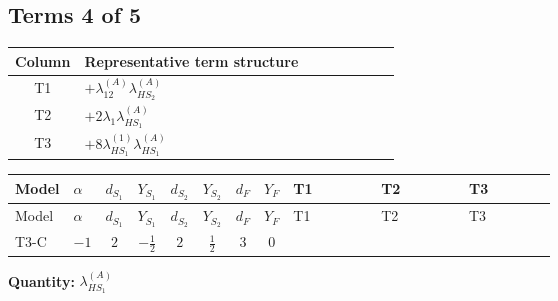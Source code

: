 \documentclass[8pt]{article}
\begin{document}
\begin{landscape}
\subsection*{Terms 4 of 5}
\begin{center}
\begin{tabular}{@{}c >{\raggedright\arraybackslash}p{0.82\linewidth}@{}}
\toprule
Column & Representative term structure \\
\midrule
T1 & \(\displaystyle +{\lambda_{12}^{(A)}} {\lambda_{HS_2}^{(A)}}\) \\
\midrule
T2 & \(\displaystyle +2 {\lambda_1} {\lambda_{HS_1}^{(A)}}\) \\
\midrule
T3 & \(\displaystyle +8 {\lambda_{HS_1}^{(1)}} {\lambda_{HS_1}^{(A)}}\) \\
\midrule
\bottomrule
\end{tabular}
\end{center}
\smallskip
\tiny
\begin{longtable}{@{}llcccccc >{\raggedright\arraybackslash}p{0.21\linewidth} >{\raggedright\arraybackslash}p{0.21\linewidth} >{\raggedright\arraybackslash}p{0.21\linewidth}@{}}
\toprule
Model & $\alpha$ & $d_{S_1}$ & $Y_{S_1}$ & $d_{S_2}$ & $Y_{S_2}$ & $d_F$ & $Y_F$ & T1 & T2 & T3 \\
\midrule
\endfirsthead
\toprule
Model & $\alpha$ & $d_{S_1}$ & $Y_{S_1}$ & $d_{S_2}$ & $Y_{S_2}$ & $d_F$ & $Y_F$ & T1 & T2 & T3 \\
\midrule
\endhead
T3-C & $-1$ & $2$ & $-\frac{1}{2}$ & $2$ & $\frac{1}{2}$ & $3$ & $0$ & \scriptsize\adjustbox{max width=\linewidth}{$\begin{gathered} +{\lambda_{12}^{(A)}} {\lambda_{HS_2}^{(A)}}\end{gathered}$} & \scriptsize\adjustbox{max width=\linewidth}{$\begin{gathered} +2 {\lambda_1} {\lambda_{HS_1}^{(A)}}\end{gathered}$} & \scriptsize\adjustbox{max width=\linewidth}{$\begin{gathered} +8 {\lambda_{HS_1}^{(1)}} {\lambda_{HS_1}^{(A)}}\end{gathered}$} \\
\midrule
\bottomrule
\end{longtable}
\clearpage
\noindent\textbf{Quantity: }$\lambda_{HS_1}^{(A)}$\par\smallskip

\end{landscape}
\end{document}
